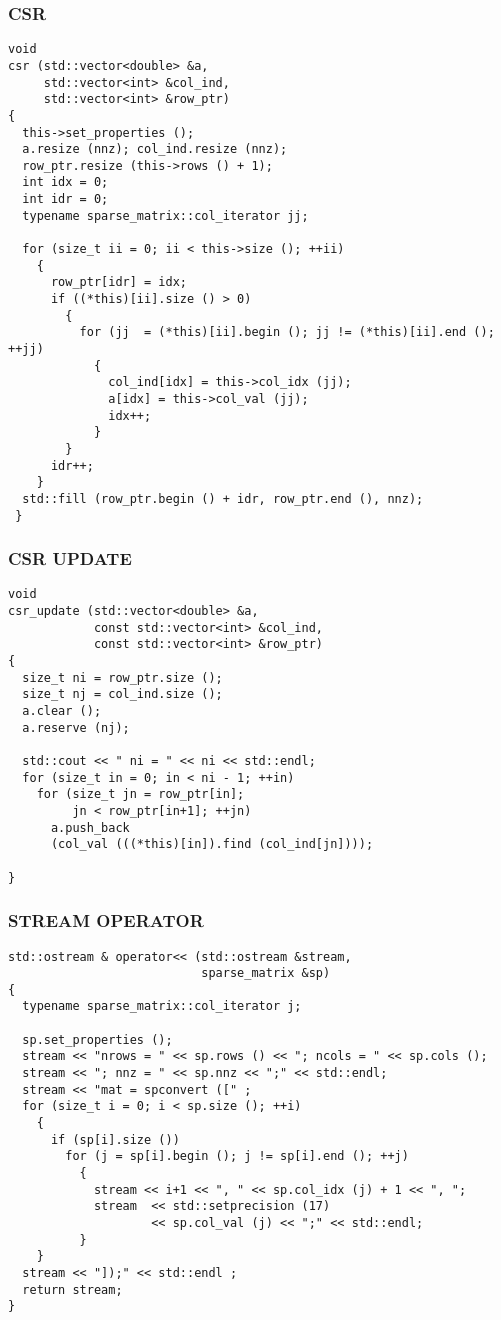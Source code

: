 \documentclass{beamer}
\begin{document}
\begin{frame}[fragile]
\frametitle{CSR}\tiny
\begin{lstlisting}
void
csr (std::vector<double> &a,
     std::vector<int> &col_ind,
     std::vector<int> &row_ptr)
{     
  this->set_properties ();
  a.resize (nnz); col_ind.resize (nnz);
  row_ptr.resize (this->rows () + 1);
  int idx = 0;
  int idr = 0;
  typename sparse_matrix::col_iterator jj;

  for (size_t ii = 0; ii < this->size (); ++ii)
    {
      row_ptr[idr] = idx;
      if ((*this)[ii].size () > 0)
        {
          for (jj  = (*this)[ii].begin (); jj != (*this)[ii].end (); ++jj)
            {
              col_ind[idx] = this->col_idx (jj);
              a[idx] = this->col_val (jj);
              idx++;
            }
        }
      idr++;
    }
  std::fill (row_ptr.begin () + idr, row_ptr.end (), nnz);
 } 
\end{lstlisting}
\end{frame}

\begin{frame}[fragile]
\frametitle{CSR UPDATE}\small
\begin{lstlisting}
void
csr_update (std::vector<double> &a,
            const std::vector<int> &col_ind,
            const std::vector<int> &row_ptr)
{
  size_t ni = row_ptr.size ();
  size_t nj = col_ind.size ();
  a.clear ();
  a.reserve (nj);

  std::cout << " ni = " << ni << std::endl;
  for (size_t in = 0; in < ni - 1; ++in)
    for (size_t jn = row_ptr[in]; 
         jn < row_ptr[in+1]; ++jn)
      a.push_back 
      (col_val (((*this)[in]).find (col_ind[jn])));

}
\end{lstlisting}
\end{frame}

\begin{frame}[fragile]
\frametitle{STREAM OPERATOR}\tiny
\begin{lstlisting}
std::ostream & operator<< (std::ostream &stream,
                           sparse_matrix &sp)
{
  typename sparse_matrix::col_iterator j;

  sp.set_properties ();
  stream << "nrows = " << sp.rows () << "; ncols = " << sp.cols ();
  stream << "; nnz = " << sp.nnz << ";" << std::endl;
  stream << "mat = spconvert ([" ;
  for (size_t i = 0; i < sp.size (); ++i)
    {
      if (sp[i].size ())
        for (j = sp[i].begin (); j != sp[i].end (); ++j)
          {
            stream << i+1 << ", " << sp.col_idx (j) + 1 << ", ";
            stream  << std::setprecision (17)
                    << sp.col_val (j) << ";" << std::endl;
          }
    }
  stream << "]);" << std::endl ;
  return stream;
}
\end{lstlisting}
\end{frame}
\end{document}
